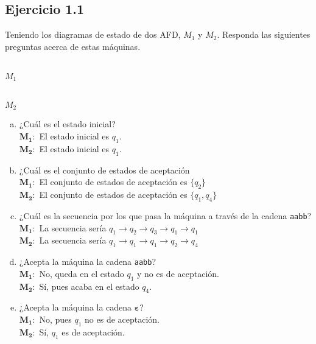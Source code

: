 \documentclass{article}
\begin{document}
\subsection*{Ejercicio 1.1}
Teniendo los diagramas de estado de dos AFD, $M_1$ y $M_2$. Responda las siguientes preguntas acerca de estas máquinas.
\begin{multicols}{2}
\begin{center}
\\
$M_1$
\end{center}

\begin{center}
\\
$M_2$
\end{center}
\end{multicols}
\begin{enumerate}[a.]
    \item ¿Cuál es el estado inicial?\\
    $\boldsymbol{M_1}:$ El estado inicial es $q_1$.\\
    $\boldsymbol{M_2}:$ El estado inicial es $q_1$.
    
    \item ¿Cuál es el conjunto de estados de aceptación\\
    $\boldsymbol{M_1}:$ El conjunto de estados de aceptación es $\{q_2\}$\\
    $\boldsymbol{M_2}:$ El conjunto de estados de aceptación es $\{q_1,q_4\}$
    
    \item ¿Cuál es la secuencia por los que pasa la máquina a través de la cadena \texttt{aabb}?\\
    $\boldsymbol{M_1}:$ La secuencia sería  $q_1\to q_2\to q_3\to q_1\to q_1$\\
    $\boldsymbol{M_2}:$ La secuencia sería  $q_1\to q_1\to q_1\to q_2\to q_4$
    
    \item ¿Acepta la máquina la cadena \texttt{aabb}?\\
    $\boldsymbol{M_1}:$ No, queda en el estado $q_1$ y no es de aceptación.\\
    $\boldsymbol{M_2}:$ Sí, pues acaba en el estado $q_4$.
    
    \item ¿Acepta la máquina la cadena $\boldsymbol{\varepsilon}$?\\
    $\boldsymbol{M_1}:$ No, pues $q_1$ no es de aceptación.\\
    $\boldsymbol{M_2}:$ Sí, $q_1$ es de aceptación.\\
\end{enumerate}
\end{document}
